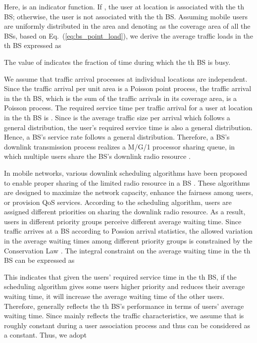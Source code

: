 \documentclass[journal]{IEEEtran}
\theoremstyle{definition}
\begin{document}
Here,  is an indicator function. If , the user at location  is associated with the th BS; otherwise, the user is not associated with the th BS.
Assuming mobile users are uniformly distributed in the area and denoting  as the coverage area of all the BSs, based on Eq.~(\ref{eq:bs_point_load}), we derive the average traffic loads in the th BS expressed as

The value of  indicates the fraction of time during which the th BS is busy.

We assume that traffic arrival processes at individual locations are independent. Since the traffic arrival per unit area is a Poisson point process, the traffic arrival in the th BS, which is the sum of the traffic arrivals in its coverage area, is a Poisson process. The required service time per traffic arrival for a user at location  in the th BS is .
Since  is the average traffic size per arrival which follows a general distribution, the user's required service time is also a general distribution. Hence, a BS's service rate follows a general distribution. Therefore, a BS's downlink transmission process realizes a M/G/1 processor sharing queue, in which multiple users share the BS's downlink radio resource \cite{Kleinrock:1976:QS}.

In mobile networks, various downlink scheduling algorithms have been proposed to enable proper sharing of the limited radio resource in a BS \cite{Capozzi:2013:DPS}. These algorithms are designed to maximize the network capacity, enhance the fairness among users, or provision QoS services. According to the scheduling algorithm, users are assigned different priorities on sharing the downlink radio resource. As a result, users in different priority groups perceive different average waiting time. Since traffic arrives at a BS according to Possion arrival statistics, the allowed variation in the average waiting times among different priority groups is constrained by the Conservation Law \cite{Kleinrock:1976:QS}. The integral constraint on the average waiting time in the th BS can be expressed as

This indicates that given the users' required service time in the th BS, if the scheduling algorithm gives some users higher priority and reduces their average waiting time, it will increase the average waiting time of the other users. Therefore,  generally reflects the th BS's performance in terms of users' average waiting time. 
Since  mainly reflects the traffic characteristics, we assume that  is roughly constant during a user association process and thus  can be considered as a constant. Thus, we adopt
\end{document}
